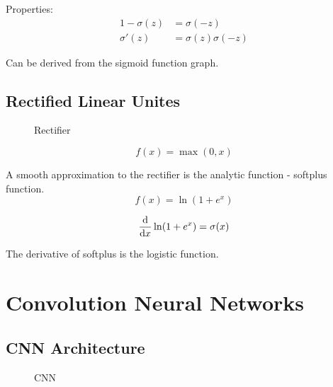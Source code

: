 \documentclass[a4paper]{report}
\begin{document}
Properties:
\begin{align*}
1-\sigma(z) &= \sigma(-z) \\
\sigma'(z) &= \sigma(z)\sigma(-z)
\end{align*}

Can be derived from the sigmoid function graph. 

\subsection{Rectified Linear Unites}
\begin{figure}[!htp]
\centering
{}
\caption{Rectifier}
\label{fig:rectifier}
\end{figure}
$$
f(x) = \max(0, x)
$$

A smooth approximation to the rectifier is the analytic function - softplus function.
$$
f(x) = \ln(1 + e^x)
$$

$$
\frac{\mathop{}\!\mathrm{d}}{\mathop{}\!\mathrm{d} x} \ln(1 + e^x) = \sigma(x)
$$

The derivative of softplus is the logistic function.

\section{Convolution Neural Networks}
\subsection{CNN Architecture}
\begin{figure}[!htp]
\centering
{}
\caption{CNN}
\label{fig:cnn}
\end{figure}
\end{document}
